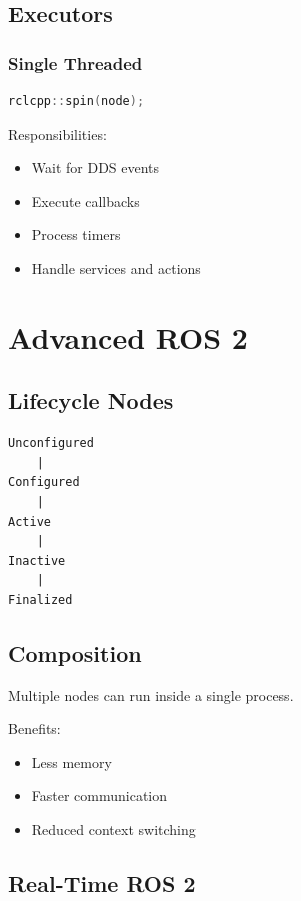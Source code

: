 \documentclass[11pt,oneside]{book}
\begin{document}
\chapter{Executors}

\section{Single Threaded}

\begin{lstlisting}[language=C++]
rclcpp::spin(node);
\end{lstlisting}

Responsibilities:

\begin{itemize}
\item Wait for DDS events
\item Execute callbacks
\item Process timers
\item Handle services and actions
\end{itemize}

\part{Advanced ROS 2}

\chapter{Lifecycle Nodes}

\begin{verbatim}
Unconfigured
    |
Configured
    |
Active
    |
Inactive
    |
Finalized
\end{verbatim}

\chapter{Composition}

Multiple nodes can run inside a single process.

Benefits:

\begin{itemize}
\item Less memory
\item Faster communication
\item Reduced context switching
\end{itemize}

\chapter{Real-Time ROS 2}
\end{document}

